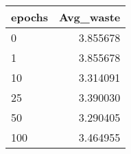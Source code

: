 \begin{tabular}{lr}
\toprule
epochs &  Avg\_waste \\
\midrule
     0 &   3.855678 \\
     1 &   3.855678 \\
    10 &   3.314091 \\
    25 &   3.390030 \\
    50 &   3.290405 \\
   100 &   3.464955 \\
\bottomrule
\end{tabular}

